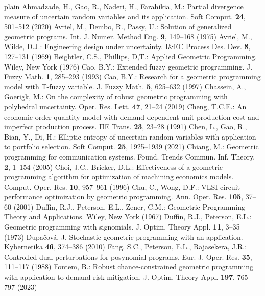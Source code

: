 \begin{thebibliography}{plain}
 Ahmadzade, H., Gao, R., Naderi, H., Farahikia, M.: Partial divergence measure of uncertain random variables and its application. Soft Comput. {\bf 24}, 501--512 (2020)
 Avriel, M., Dembo, R., Passy, U.: Solution of generalized geometric programs. Int. J. Numer. Method Eng. {\bf 9}, 149--168 (1975)
 Avriel, M., Wilde, D.J.: Engineering design under uncertainty. I\&EC Process Des. Dev. {\bf 8}, 127--131 (1969)
 Beightler, C.S., Phillips, D,T.: Applied Geometric Programming. Wiley, New York (1976)
 Cao, B.Y.: Extended fuzzy geometric programming. J. Fuzzy Math. {\bf 1}, 285--293 (1993)
 Cao, B.Y.: Research for a geometric programming model with T-fuzzy variable. J. Fuzzy Math. {\bf 5}, 625--632 (1997)
 Chassein, A., Goerigk, M.: On the complexity of robust geometric programming with polyhedral uncertainty. Oper. Res. Lett. {\bf47}, 21--24 (2019)
 Cheng, T.C.E.: An economic order quantity model with demand-dependent unit production cost and imperfect production process. IIE Trans. {\bf{23}}, 23--28 (1991)
 Chen, L., Gao, R., Bian, Y., Di, H.: Elliptic entropy of uncertain random variables with application to portfolio selection. Soft Comput. {\bf 25}, 1925--1939 (2021)
 Chiang, M.: Geometric programming for communication systems. Found. Trends Commun. Inf. Theory. {\bf 2}, 1--154 (2005)
 Choi, J.C., Bricker, D.L.: Effectiveness of a geometric programming algorithm for optimization of machining economics models. Comput. Oper. Res. {\bf 10}, 957--961 (1996)
Chu, C., Wong, D.F.: VLSI circuit performance optimization by geometric programming. Ann. Oper. Res. {\bf 105}, 37--60 (2001)
 Duffin, R.J., Peterson, E.L., Zener, C.M.: Geometric Programming Theory and Applications. Wiley, New York (1967)
 Duffin, R.J., Peterson, E.L.: Geometric programming with signomials. J. Optim. Theory Appl. {\bf11}, 3--35 (1973)
 Dupačová, J. Stochastic geometric programming with an application. Kybernetika {\bf 46}, 374--386 (2010)
 Fang, S.C., Peterson, E.L., Rajasekera, J.R.: Controlled dual perturbations for posynomial programs. Eur. J. Oper. Res. {\bf 35}, 111--117 (1988)
  Fontem, B.: Robust chance-constrained geometric programming
with application to demand risk mitigation. J. Optim. Theory Appl. {\bf197}, 765--797 (2023)

\end{thebibliography}
